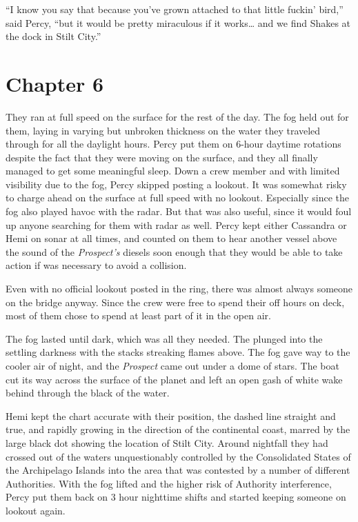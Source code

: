\documentclass[
]{scrbook}
\begin{document}
``I know you say that because you've grown attached to that little
fuckin' bird,'' said Percy, ``but it would be pretty miraculous if it
works\ldots{} and we find Shakes at the dock in Stilt City.''

\hypertarget{chapter-6}{%
\chapter*{Chapter 6}\label{chapter-6}}

They ran at full speed on the surface for the rest of the day. The fog
held out for them, laying in varying but unbroken thickness on the water
they traveled through for all the daylight hours. Percy put them on
6-hour daytime rotations despite the fact that they were moving on the
surface, and they all finally managed to get some meaningful sleep. Down
a crew member and with limited visibility due to the fog, Percy skipped
posting a lookout. It was somewhat risky to charge ahead on the surface
at full speed with no lookout. Especially since the fog also played
havoc with the radar. But that was also useful, since it would foul up
anyone searching for them with radar as well. Percy kept either
Cassandra or Hemi on sonar at all times, and counted on them to hear
another vessel above the sound of the \emph{Prospect's} diesels soon
enough that they would be able to take action if was necessary to avoid
a collision.

Even with no official lookout posted in the ring, there was almost
always someone on the bridge anyway. Since the crew were free to spend
their off hours on deck, most of them chose to spend at least part of it
in the open air.

The fog lasted until dark, which was all they needed. The plunged into
the settling darkness with the stacks streaking flames above. The fog
gave way to the cooler air of night, and the \emph{Prospect} came out
under a dome of stars. The boat cut its way across the surface of the
planet and left an open gash of white wake behind through the black of
the water.

Hemi kept the chart accurate with their position, the dashed line
straight and true, and rapidly growing in the direction of the
continental coast, marred by the large black dot showing the location of
Stilt City. Around nightfall they had crossed out of the waters
unquestionably controlled by the Consolidated States of the Archipelago
Islands into the area that was contested by a number of different
Authorities. With the fog lifted and the higher risk of Authority
interference, Percy put them back on 3 hour nighttime shifts and started
keeping someone on lookout again.
\end{document}
